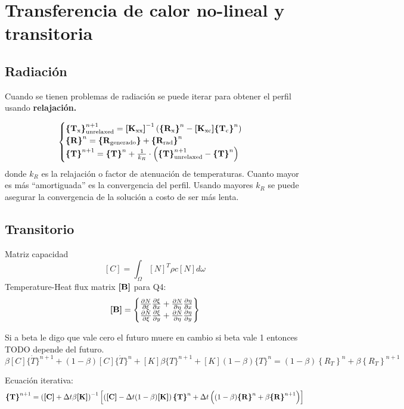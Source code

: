 \section{Transferencia de calor no-lineal y transitoria}

\subsection*{Radiación}
Cuando se tienen problemas de radiación se puede iterar para obtener el perfil usando \textbf{relajación.}


\begin{equation}
\begin{cases}
\boldsymbol{\{ }\mathbf{T_{\mathrm{x}}} \boldsymbol{\}}^{n+1}_{\mathrm{unrelaxed}} =  \boldsymbol{[}\mathbf{K_{\mathrm{xx}}} \boldsymbol{]}^{-1}  \left(\boldsymbol{\{ }\mathbf{R_{\mathrm{x}}} \boldsymbol{\}}^{n} - \boldsymbol{[}\mathbf{K_{\mathrm{xc}}} \boldsymbol{]} \boldsymbol{\{ }\mathbf{T_{\mathrm{c}}} \boldsymbol{\}}^{n}\right)\\
\boldsymbol{\{ }\mathbf{R} \boldsymbol{\}}^{n} = \boldsymbol{\{ }\mathbf{R_{\mathrm{generado}}} \boldsymbol{\}}+ \boldsymbol{\{ }\mathbf{R_{\mathrm{rad}}} \boldsymbol{\}}^{n} \\
\boldsymbol{\{ }\mathbf{T} \boldsymbol{\}}^{n+1} = \boldsymbol{\{ }\mathbf{T} \boldsymbol{\}}^n + \frac{1}{k_R} \cdot \left( \boldsymbol{\{ }\mathbf{T} \boldsymbol{\}}^{n+1}_{\mathrm{unrelaxed}} - \boldsymbol{\{ }\mathbf{T} \boldsymbol{\}}^{n} \right)
\end{cases}
\end{equation}
donde $k_R$ es la relajación o factor de atenuación de temperaturas. Cuanto mayor es más ``amortiguada'' es la convergencia del perfil. Usando mayores $k_R$ se puede asegurar la convergencia de la solución a costo de ser más lenta.


\subsection*{Transitorio}
Matriz capacidad
\[
[C]=\int_{\Omega}[N]^{T} \rho c[N] d \omega
\]
Temperature-Heat flux matrix $\boldsymbol{[}\mathbf{B} \boldsymbol{]}$ para Q4:
\[
\boldsymbol{[}\mathbf{B} \boldsymbol{]} =
\begin{Bmatrix}
\frac{\partial N}{\partial \xi} \frac{\partial \xi}{\partial x} + \frac{\partial N}{\partial \eta} \frac{\partial \eta}{\partial x} \\
\frac{\partial N}{\partial \xi} \frac{\partial \xi}{\partial y} + \frac{\partial N}{\partial \eta} \frac{\partial \eta}{\partial y} 
\end{Bmatrix}
\]

Si a beta le digo que vale cero el futuro muere en cambio si beta vale 1 entonces TODO depende del futuro.
\[
\beta[C]\{\dot{T}\}^{n+1}+(1-\beta)[C]\{\dot{T}\}^{n}+[K] \beta\{T\}^{n+1}+[K](1-\beta)\{T\}^{n}=(1-\beta)\left\{R_{T}\right\}^{n}+\beta\left\{R_{T}\right\}^{n+1}
\]

Ecuación iterativa:
\begin{equation}
\boldsymbol{\{ }\mathbf{T} \boldsymbol{\}}^{n+1} = \left( \boldsymbol{[}\mathbf{C} \boldsymbol{]} +\Delta t \beta \boldsymbol{[}\mathbf{K} \boldsymbol{]} \right)^{-1} \left[ \left(\boldsymbol{[}\mathbf{C} \boldsymbol{]} -\Delta t(1-\beta) \boldsymbol{[}\mathbf{K} \boldsymbol{]}\right) \boldsymbol{\{ }\mathbf{T} \boldsymbol{\}}^n +\Delta t \left( (1-\beta) \boldsymbol{\{ }\mathbf{R} \boldsymbol{\}}^n + \beta \boldsymbol{\{ }\mathbf{R} \boldsymbol{\}}^{n+1}  \right)\right]
\end{equation}



